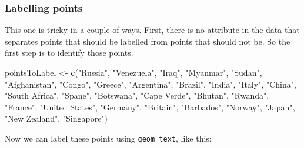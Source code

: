 \documentclass[]{book}
\newenvironment{Shaded}{\begin{snugshade}}{\end{snugshade}}
\newcommand{\KeywordTok}[1]{\textcolor[rgb]{0.13,0.29,0.53}{\textbf{#1}}}
\newcommand{\DataTypeTok}[1]{\textcolor[rgb]{0.13,0.29,0.53}{#1}}
\newcommand{\StringTok}[1]{\textcolor[rgb]{0.31,0.60,0.02}{#1}}
\newcommand{\OperatorTok}[1]{\textcolor[rgb]{0.81,0.36,0.00}{\textbf{#1}}}
\newcommand{\NormalTok}[1]{#1}
\begin{document}
\subsubsection{Labelling points}\label{labelling-points}

This one is tricky in a couple of ways. First, there is no attribute in
the data that separates points that should be labelled from points that
should not be. So the first step is to identify those points.

\begin{Shaded}
\begin{Highlighting}[]
\NormalTok{pointsToLabel <-}\StringTok{ }\KeywordTok{c}\NormalTok{(}\StringTok{"Russia"}\NormalTok{, }\StringTok{"Venezuela"}\NormalTok{, }\StringTok{"Iraq"}\NormalTok{, }\StringTok{"Myanmar"}\NormalTok{, }\StringTok{"Sudan"}\NormalTok{,}
                   \StringTok{"Afghanistan"}\NormalTok{, }\StringTok{"Congo"}\NormalTok{, }\StringTok{"Greece"}\NormalTok{, }\StringTok{"Argentina"}\NormalTok{, }\StringTok{"Brazil"}\NormalTok{,}
                   \StringTok{"India"}\NormalTok{, }\StringTok{"Italy"}\NormalTok{, }\StringTok{"China"}\NormalTok{, }\StringTok{"South Africa"}\NormalTok{, }\StringTok{"Spane"}\NormalTok{,}
                   \StringTok{"Botswana"}\NormalTok{, }\StringTok{"Cape Verde"}\NormalTok{, }\StringTok{"Bhutan"}\NormalTok{, }\StringTok{"Rwanda"}\NormalTok{, }\StringTok{"France"}\NormalTok{,}
                   \StringTok{"United States"}\NormalTok{, }\StringTok{"Germany"}\NormalTok{, }\StringTok{"Britain"}\NormalTok{, }\StringTok{"Barbados"}\NormalTok{, }\StringTok{"Norway"}\NormalTok{, }\StringTok{"Japan"}\NormalTok{,}
                   \StringTok{"New Zealand"}\NormalTok{, }\StringTok{"Singapore"}\NormalTok{)}
\end{Highlighting}
\end{Shaded}

Now we can label these points using \texttt{geom\_text}, like this:

\begin{Shaded}
\end{Shaded}
\end{document}
